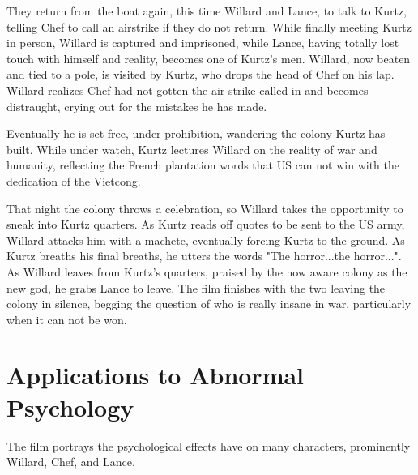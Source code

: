 \documentclass[a4paper,man,natbib]{apa6}
\begin{document}
They return from the boat again, this time Willard and Lance, to talk to Kurtz, telling Chef to call an airstrike if they do not return. While finally meeting Kurtz in person, Willard is captured and imprisoned, while Lance, having totally lost touch with himself and reality, becomes one of Kurtz's men. Willard, now beaten and tied to a pole, is visited by Kurtz, who drops the head of Chef on his lap. Willard realizes Chef had not gotten the air strike called in and becomes distraught, crying out for the mistakes he has made.

Eventually he is set free, under prohibition, wandering the colony Kurtz has built. While under watch, Kurtz lectures Willard on the reality of war and humanity, reflecting the French plantation words that US can not win with the dedication of the Vietcong.

That night the colony throws a celebration, so Willard takes the opportunity to sneak into Kurtz quarters. As Kurtz reads off quotes to be sent to the US army, Willard attacks him with a machete, eventually forcing Kurtz to the ground. As Kurtz breaths his final breaths, he utters the words "The horror...the horror...". As Willard leaves from Kurtz's quarters, praised by the now aware colony as the new god, he grabs Lance to leave. The film finishes with the two leaving the colony  in silence, begging the question of who is really insane in war, particularly when it can not be won.

\section{Applications to Abnormal Psychology}

The film portrays the psychological effects have on many characters, prominently Willard, Chef, and Lance.
\end{document}
